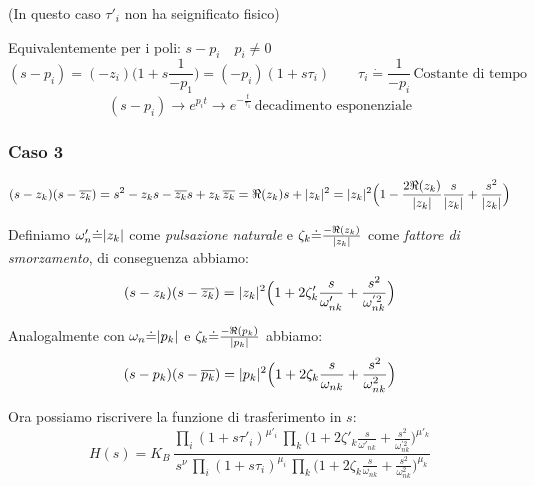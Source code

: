  (In questo caso $ \tau'_i $ non ha seignificato fisico) %
 
 Equivalentemente per i poli: $ s-p_i \quad p_i \ne 0 $
 \[ 
 (s-p_i)=(-z_i)\Big(1+s \frac{1}{-p_1} \Big)=(-p_i)(1+s \tau_i) \qquad \tau_i \dot{=} \frac{1}{-p_i} \, \text{Costante di tempo}
 \]
 \[ (s-p_i) \rightarrow e^{p_i t} \rightarrow e^{-\frac{t}{\tau_1}} \, \text{decadimento esponenziale}\]
 
 \subsubsection{Caso 3}
 \[ 
 	(s-z_k)(s-\overline{z_k}) = s^2-z_ks-\overline{z_k}s+z_k \,\overline{z_k} = \Re(z_k) s+\lvert z_k\rvert^2 = \lvert z_k\rvert^2\Big(1-\frac{2 \Re(z_k)}{\lvert z_k\rvert}\frac{s}{\lvert z_k\rvert}+\frac{s^2}{\lvert z_k\rvert} \Big)
 \]

 Definiamo $ \omega'_n \dot{=} \lvert z_k\rvert $ come \emph{pulsazione naturale} e $ \zeta_k \dot{=} \frac{-\Re(z_k)}{\lvert z_k\rvert} $ come \emph{fattore di smorzamento}, di conseguenza abbiamo: 
 \[ 
 	(s-z_k)(s-\overline{z_k}) = \lvert z_k\rvert^2\Big(1+2\zeta'_k\frac{s}{\omega'_{nk}}+\frac{s^2}{\omega^{'2}_{nk}} \Big)
  \]
  
  Analogalmente con $ \omega_n \dot{=} \lvert p_k\rvert $ e $ \zeta_k \dot{=} \frac{-\Re(p_k)}{\lvert p_k\rvert} $ abbiamo:
   \[ 
  (s-p_k)(s-\overline{p_k}) = \lvert p_k\rvert^2\Big(1+2\zeta_k\frac{s}{\omega_{nk}}+\frac{s^2}{\omega^{2}_{nk}} \Big)
  \]
  
  Ora possiamo riscrivere la funzione di trasferimento in $ s $:
  \[ 
  	H(s) = K_B \, \frac{\prod_i (1+s\tau'_i)^{\mu'_i}\,  \prod_k \Big(1+2\zeta'_k\frac{s}{\omega'_{nk}}+\frac{s^2}{\omega^{'2}_{nk}} \Big)^{\mu'_k}}{s^\nu\, \prod_i (1+s\tau_i)^{\mu_i}\,  \prod_k \Big(1+2\zeta_k\frac{s}{\omega_{nk}}+\frac{s^2}{\omega^{2}_{nk}} \Big)^{\mu_k} }
   \]